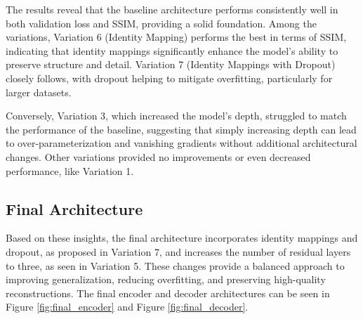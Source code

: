 The results reveal that the baseline architecture performs consistently well in both validation loss and \gls{SSIM}, providing a solid foundation.
Among the variations, Variation 6 (Identity Mapping) performs the best in terms of \gls{SSIM}, indicating that identity mappings significantly enhance the model’s ability to preserve structure and detail.
Variation 7 (Identity Mappings with Dropout) closely follows, with dropout helping to mitigate overfitting, particularly for larger datasets.

Conversely, Variation 3, which increased the model’s depth, struggled to match the performance of the baseline, suggesting that simply increasing depth can lead to over-parameterization and vanishing gradients without additional architectural changes.
Other variations provided no improvements or even decreased performance, like Variation 1. 

\subsection{Final Architecture} \label{subsection:final_architecture}
Based on these insights, the final architecture incorporates identity mappings and dropout, as proposed in Variation 7, and increases the number of residual layers to three, as seen in Variation 5.
These changes provide a balanced approach to improving generalization, reducing overfitting, and preserving high-quality reconstructions.
The final encoder and decoder architectures can be seen in Figure \ref{fig:final_encoder} and Figure \ref{fig:final_decoder}.

